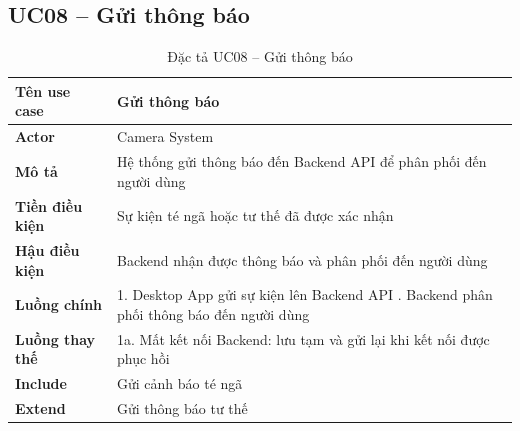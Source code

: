 \subsection*{UC08 -- Gửi thông báo}
\begin{table}[H]
    \captionsetup{justification=raggedright, singlelinecheck=false}
    \caption{Đặc tả UC08 -- Gửi thông báo}
\centering
\begin{tabular}{|p{3.5cm}|p{10cm}|}
\hline
\textbf{Tên use case} & Gửi thông báo \\
\hline
\textbf{Actor} & Camera System \\
\hline
\textbf{Mô tả} & Hệ thống gửi thông báo đến Backend API
  để phân phối đến người dùng \\
\hline
\textbf{Tiền điều kiện} & Sự kiện té ngã hoặc tư thế
  đã được xác nhận \\
\hline
\textbf{Hậu điều kiện} & Backend nhận được thông báo
  và phân phối đến người dùng \\
\hline
\textbf{Luồng chính} &
  1. Desktop App gửi sự kiện lên Backend API \newline
  2. Backend phân phối thông báo đến người dùng \\
\hline
\textbf{Luồng thay thế} &
  1a. Mất kết nối Backend: lưu tạm và gửi lại
  khi kết nối được phục hồi \\
\hline
\textbf{Include} & Gửi cảnh báo té ngã \\
\hline
\textbf{Extend} & Gửi thông báo tư thế \\
\hline
\end{tabular}

\end{table}

